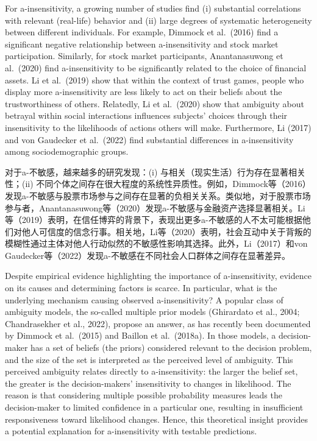 \documentclass[12pt,a4paper]{article}
\newenvironment{original}
  {\par\medskip\noindent\color{black}\ignorespaces}
  {\par\medskip}
\newenvironment{translation}
  {\par\noindent\color{transblue}\ignorespaces}
  {\par\medskip\medskip}
\begin{document}
\begin{original}
For a-insensitivity, a growing number of studies find (i) substantial correlations with relevant (real-life) behavior and (ii) large degrees of systematic heterogeneity between different individuals. For example, Dimmock et al.\ (2016) find a significant negative relationship between a-insensitivity and stock market participation. Similarly, for stock market participants, Anantanasuwong et al.\ (2020) find a-insensitivity to be significantly related to the choice of financial assets. Li et al.\ (2019) show that within the context of trust games, people who display more a-insensitivity are less likely to act on their beliefs about the trustworthiness of others. Relatedly, Li et al.\ (2020) show that ambiguity about betrayal within social interactions influences subjects' choices through their insensitivity to the likelihoods of actions others will make. Furthermore, Li (2017) and von Gaudecker et al.\ (2022) find substantial differences in a-insensitivity among sociodemographic groups.
\end{original}

\begin{translation}
对于a-不敏感，越来越多的研究发现：(i) 与相关（现实生活）行为存在显著相关性；(ii) 不同个体之间存在很大程度的系统性异质性。例如，Dimmock等（2016）发现a-不敏感与股票市场参与之间存在显著的负相关关系。类似地，对于股票市场参与者，Anantanasuwong等（2020）发现a-不敏感与金融资产选择显著相关。Li等（2019）表明，在信任博弈的背景下，表现出更多a-不敏感的人不太可能根据他们对他人可信度的信念行事。相关地，Li等（2020）表明，社会互动中关于背叛的模糊性通过主体对他人行动似然的不敏感性影响其选择。此外，Li（2017）和von Gaudecker等（2022）发现a-不敏感在不同社会人口群体之间存在显著差异。
\end{translation}

\begin{original}
Despite empirical evidence highlighting the importance of a-insensitivity, evidence on its causes and determining factors is scarce. In particular, what is the underlying mechanism causing observed a-insensitivity? A popular class of ambiguity models, the so-called multiple prior models (Ghirardato et al., 2004; Chandrasekher et al., 2022), propose an answer, as has recently been documented by Dimmock et al.\ (2015) and Baillon et al.\ (2018a). In those models, a decision-maker has a set of beliefs (the priors) considered relevant to the decision problem, and the size of the set is interpreted as the perceived level of ambiguity. This perceived ambiguity relates directly to a-insensitivity: the larger the belief set, the greater is the decision-makers' insensitivity to changes in likelihood. The reason is that considering multiple possible probability measures leads the decision-maker to limited confidence in a particular one, resulting in insufficient responsiveness toward likelihood changes. Hence, this theoretical insight provides a potential explanation for a-insensitivity with testable predictions.
\end{original}
\end{document}
